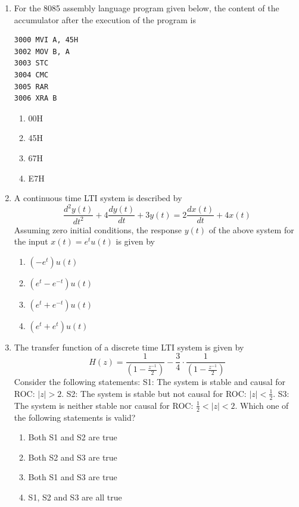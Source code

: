\documentclass[journal,12pt,onecolumn]{IEEEtran}
\begin{document}
\begin{enumerate}
\item For the 8085 assembly language program given below, the content of the accumulator after the execution of the program is
\begin{verbatim}
3000 MVI A, 45H
3002 MOV B, A
3003 STC
3004 CMC
3005 RAR
3006 XRA B
\end{verbatim}
\begin{multicols}{2}
\begin{enumerate}
\item 00H
\item 45H
\item 67H
\item E7H
\end{enumerate}
\end{multicols}

\item A continuous time LTI system is described by
$$
\frac{d^2 y(t)}{dt^2}+4\frac{dy(t)}{dt}+3y(t)=2\frac{dx(t)}{dt}+4x(t)
$$
Assuming zero initial conditions, the response $y(t)$ of the above system for the input $x(t)=e^t u(t)$ is given by
\begin{multicols}{2}
\begin{enumerate}
\item $( -e^t) u(t)$
\item $(e^t - e^{-t}) u(t)$
\item $(e^t + e^{-t}) u(t)$
\item $(e^t + e^t) u(t)$
\end{enumerate}
\end{multicols}

\item The transfer function of a discrete time LTI system is given by
$$
H(z)=\frac{1}{(1-\frac{z^{-1}}{2})} - \frac{3}{4}\cdot\frac{1}{(1-\frac{z^{-1}}{2})}
$$
Consider the following statements: S1: The system is stable and causal for ROC: $|z|>2$. S2: The system is stable but not causal for ROC: $|z|<\frac{1}{2}$. S3: The system is neither stable nor causal for ROC: $\frac{1}{2}<|z|<2$. Which one of the following statements is valid?
\begin{multicols}{2}
\begin{enumerate}
\item Both S1 and S2 are true
\item Both S2 and S3 are true
\item Both S1 and S3 are true
\item S1, S2 and S3 are all true
\end{enumerate}
\end{multicols}


\end{enumerate}
\end{document}
